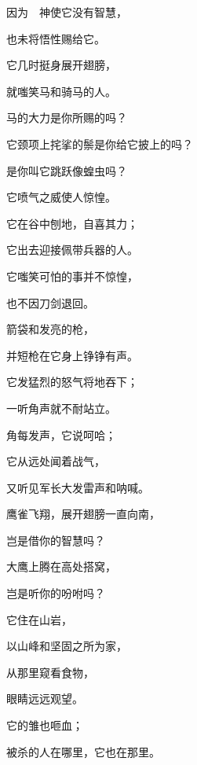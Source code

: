 {\par }{\Q {}因为　神使它没有智慧，
\par }{\Q 也未将悟性赐给它。
\par }{\Q {}它几时挺身展开翅膀，
\par }{\Q 就嗤笑马和骑马的人。
\par }{\BB \par }{\Q {}马的大力是你所赐的吗？
\par }{\Q 它颈项上挓挲的鬃是你给它披上的吗？
\par }{\Q {}是你叫它跳跃像蝗虫吗？
\par }{\Q 它喷气之威使人惊惶。
\par }{\Q {}它在谷中刨地，自喜其力；
\par }{\Q 它出去迎接佩带兵器的人。
\par }{\Q {}它嗤笑可怕的事并不惊惶，
\par }{\Q 也不因刀剑退回。
\par }{\Q {}箭袋和发亮的枪，
\par }{\Q 并短枪在它身上铮铮有声。
\par }{\Q {}它发猛烈的怒气将地吞下；
\par }{\Q 一听角声就不耐站立。
\par }{\Q {}角每发声，它说呵哈；
\par }{\Q 它从远处闻着战气，
\par }{\Q 又听见军长大发雷声和{}呐喊。
\par }{\BB \par }{\Q {}鹰雀飞翔，展开翅膀一直向南，
\par }{\Q 岂是借你的智慧吗？
\par }{\Q {}大鹰上腾在高处搭窝，
\par }{\Q 岂是听你的吩咐吗？
\par }{\Q {}它住在山岩，
\par }{\Q 以山峰和坚固之所为家，
\par }{\Q {}从那里窥看食物，
\par }{\Q 眼睛远远观望。
\par }{\Q {}它的雏也咂血；
\par }{\Q 被杀的人在哪里，它也在那里。

}
